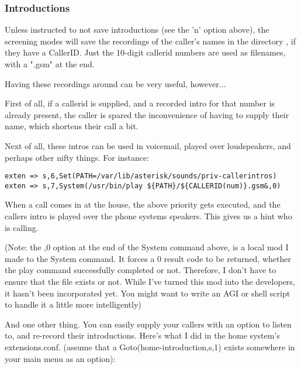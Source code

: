 \subsubsection{Introductions}
Unless instructed to not save introductions (see the 'n' option above),
the screening modes will save the recordings of the caller's names in
the directory , if they have
a CallerID.  Just the 10-digit callerid numbers are used as filenames,
with a ".gsm" at the end.

Having these recordings around can be very useful, however...

First of all, if a callerid is supplied, and a recorded intro for that
number is already present, the caller is spared the inconvenience of
having to supply their name, which shortens their call a bit.

Next of all, these intros can be used in voicemail, played over
loudspeakers, and perhaps other nifty things. For instance:

\begin{verbatim}
exten => s,6,Set(PATH=/var/lib/asterisk/sounds/priv-callerintros)
exten => s,7,System(/usr/bin/play ${PATH}/${CALLERID(num)}.gsm&,0)
\end{verbatim}

When a call comes in at the house, the above priority gets executed,
and the callers intro is played over the phone systems speakers. This
gives us a hint who is calling.

(Note: the ,0 option at the end of the System command above, is a
local mod I made to the System command. It forces a 0 result code to
be returned, whether the play command successfully completed or
not. Therefore, I don't have to ensure that the file exists or
not. While I've turned this mod into the developers, it hasn't been
incorporated yet. You might want to write an AGI or shell script to
handle it a little more intelligently)

And one other thing. You can easily supply your callers with an option
to listen to, and re-record their introductions. Here's what I did in
the home system's extensions.conf. (assume that a
Goto(home-introduction,s,1) exists somewhere in your main menu as an
option):

